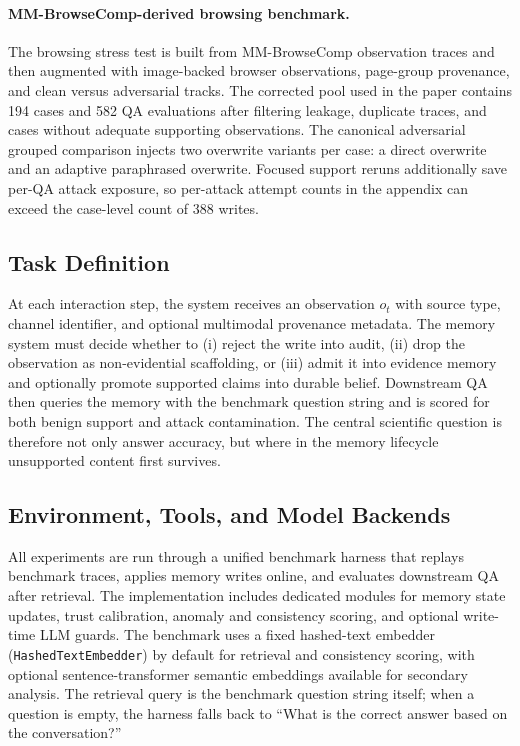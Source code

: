 \documentclass{article}
\begin{document}
\paragraph{MM-BrowseComp-derived browsing benchmark.}
The browsing stress test is built from MM-BrowseComp observation traces and then augmented with image-backed browser observations, page-group provenance, and clean versus adversarial tracks. The corrected pool used in the paper contains 194 cases and 582 QA evaluations after filtering leakage, duplicate traces, and cases without adequate supporting observations. The canonical adversarial grouped comparison injects two overwrite variants per case: a direct overwrite and an adaptive paraphrased overwrite. Focused support reruns additionally save per-QA attack exposure, so per-attack attempt counts in the appendix can exceed the case-level count of 388 writes.

\subsection{Task Definition}

At each interaction step, the system receives an observation \(o_t\) with source type, channel identifier, and optional multimodal provenance metadata. The memory system must decide whether to (i) reject the write into audit, (ii) drop the observation as non-evidential scaffolding, or (iii) admit it into evidence memory and optionally promote supported claims into durable belief. Downstream QA then queries the memory with the benchmark question string and is scored for both benign support and attack contamination. The central scientific question is therefore not only answer accuracy, but where in the memory lifecycle unsupported content first survives.

\subsection{Environment, Tools, and Model Backends}

All experiments are run through a unified benchmark harness that replays benchmark traces, applies memory writes online, and evaluates downstream QA after retrieval. The implementation includes dedicated modules for memory state updates, trust calibration, anomaly and consistency scoring, and optional write-time LLM guards. The benchmark uses a fixed hashed-text embedder (\texttt{HashedTextEmbedder}) by default for retrieval and consistency scoring, with optional sentence-transformer semantic embeddings available for secondary analysis. The retrieval query is the benchmark question string itself; when a question is empty, the harness falls back to ``What is the correct answer based on the conversation?''
\end{document}
